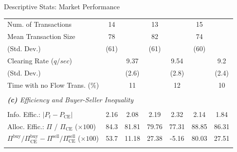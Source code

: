 \documentclass[10pt]{beamer}
\begin{document}
\begin{frame}{Descriptive Stats: Market Performance}
\begin{table}
{\begin{threeparttable}
\begin{tabular}{lcccccc}
     Num. of Transactions                             & 14        &           & 13        &           & 15        &           \\
     Mean Transaction Size                      & 78        &           & 82        &           & 74        &           \\
     \hspace{3mm}(Std. Dev.)             & (61)      &           & (61)      &           & (60)      &           \\
     Clearing Rate ($q/sec$)                 &           & 9.37      &           & 9.54      &           & 9.2       \\
     \hspace{3mm}(Std. Dev.)             &           & (2.6)     &           & (2.8)     &           & (2.4)     \\
      Time with no Flow Trans. (\%)               &           & 11          &           & 12          &           & 10           \\
     \\ [-1.8ex]
     \multicolumn{7}{l}{\textit{\textbf{(c)} Efficiency and Buyer-Seller Inequality}} \\
     \\ [-1.8ex]
     Info. Effic.: $\lvert P_t - P_{\text{CE}} \rvert $        & 2.16      & 2.08      & 2.19      & 2.32      & 2.14      & 1.84      \\     
     Alloc. Effic.: $\Pi$ / $\Pi_{\text{CE}}$ ($\times 100$)          & 84.3      & 81.81     & 79.76     & 77.31     & 88.85     & 86.31     \\
     
     ${\Pi^{\text{buy}}}/{\Pi^{\text{buy}}_{\text{CE}}} - {\Pi^{\text{sell}}}/{\Pi^{\text{sell}}_{\text{CE}}}$ 
     ($\times 100$) & 53.7      & 11.18     & 27.38     & -5.16     & 80.03     & 27.51     \\
     \\[-1.8ex] 

    \end{tabular}
    \begin{tablenotes}
      \footnotesize
    \end{tablenotes}
    \end{threeparttable}
   }
    \label{tab:summary_stat}
\end{table}
\end{frame}
\end{document}
